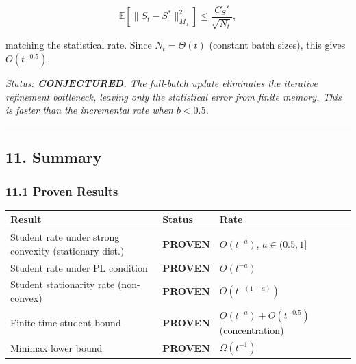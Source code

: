 \documentclass[
  12pt,
]{article}
\begin{document}
\[\mathbb{E}[\|S_t - S^*\|_{M_0}^2] \leq \frac{C_S'}{\sqrt{N_t}},\]

matching the statistical rate. Since \(N_t = \Theta(t)\) (constant batch
sizes), this gives \(O(t^{-0.5})\).

\emph{Status: \textbf{CONJECTURED.} The full-batch update eliminates the
iterative refinement bottleneck, leaving only the statistical error from
finite memory. This is faster than the incremental rate when
\(b < 0.5\).}

\begin{center}\rule{0.5\linewidth}{0.5pt}\end{center}

\subsection{11. Summary}\label{summary}

\subsubsection{11.1 Proven Results}\label{proven-results}

\begin{longtable}[]{@{}
  >{\raggedright\arraybackslash}p{}
  >{\raggedright\arraybackslash}p{}
  >{\raggedright\arraybackslash}p{}@{}}
\toprule\noalign{}
\begin{minipage}[b]{\linewidth}\raggedright
Result
\end{minipage} & \begin{minipage}[b]{\linewidth}\raggedright
Status
\end{minipage} & \begin{minipage}[b]{\linewidth}\raggedright
Rate
\end{minipage} \\
\midrule\noalign{}
\endhead
\bottomrule\noalign{}
\endlastfoot
Student rate under strong convexity (stationary dist.) & \textbf{PROVEN}
& \(O(t^{-a})\), \(a \in (0.5, 1]\) \\
Student rate under PL condition & \textbf{PROVEN} & \(O(t^{-a})\) \\
Student stationarity rate (non-convex) & \textbf{PROVEN} &
\(O(t^{-(1-a)})\) \\
Finite-time student bound & \textbf{PROVEN} &
\(O(t^{-a}) + O(t^{-0.5})\) (concentration) \\
Minimax lower bound & \textbf{PROVEN} & \(\Omega(t^{-1})\) \\
\end{longtable}
\end{document}
